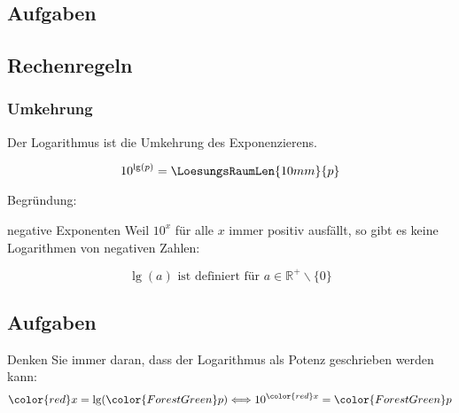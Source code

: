 \newpage
\subsection*{Aufgaben}





\newpage

\subsection{Rechenregeln}
\subsubsection{Umkehrung}

Der Logarithmus ist die Umkehrung des Exponenzierens.

\begin{gesetz}{}{}
  $$10^{\lg(p)} = \LoesungsRaumLen{10mm}{p}$$
\end{gesetz}

Begründung:

\begin{bemerkung}{negative Exponenten}{}
  Weil $10^x$ für alle $x$ immer positiv ausfällt, so gibt es keine
  Logarithmen von negativen Zahlen:

  $$\lg(a) \text{ ist definiert für } a\in\mathbb{R}^+\backslash\{0\}$$
  \end{bemerkung}
\newpage



\subsection*{Aufgaben}
Denken Sie immer daran, dass der Logarithmus als Potenz geschrieben
werden kann:
$${\color{red}x}=\lg({\color{ForestGreen}p}) \Longleftrightarrow  10^{\color{red}x}={\color{ForestGreen}p}$$

